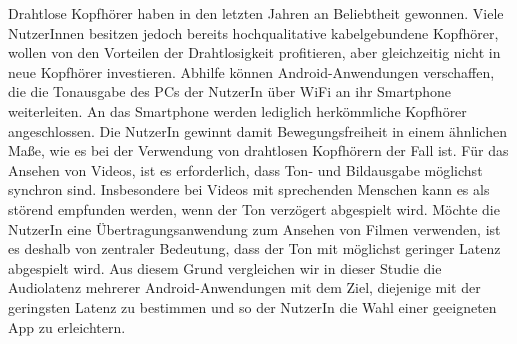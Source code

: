 Drahtlose Kopfhörer haben in den letzten Jahren an Beliebtheit gewonnen. Viele NutzerInnen besitzen jedoch bereits hochqualitative kabelgebundene Kopfhörer, wollen von den Vorteilen der Drahtlosigkeit profitieren, aber gleichzeitig nicht in neue Kopfhörer investieren. Abhilfe können Android-Anwendungen verschaffen, die die Tonausgabe des PCs der NutzerIn über WiFi an ihr Smartphone weiterleiten. An das Smartphone werden lediglich herkömmliche Kopfhörer angeschlossen. Die NutzerIn gewinnt damit Bewegungsfreiheit in einem ähnlichen Maße, wie es bei der Verwendung von drahtlosen Kopfhörern der Fall ist. Für das Ansehen von Videos, ist es erforderlich, dass Ton- und Bildausgabe möglichst synchron sind. Insbesondere bei Videos mit sprechenden Menschen kann es als störend empfunden werden, wenn der Ton verzögert abgespielt wird. Möchte die NutzerIn eine Übertragungsanwendung zum Ansehen von Filmen verwenden, ist es deshalb von zentraler Bedeutung, dass der Ton mit möglichst geringer Latenz abgespielt wird. Aus diesem Grund vergleichen wir in dieser Studie die Audiolatenz mehrerer Android-Anwendungen mit dem Ziel, diejenige mit der geringsten Latenz zu bestimmen und so der NutzerIn die Wahl einer geeigneten App zu erleichtern.